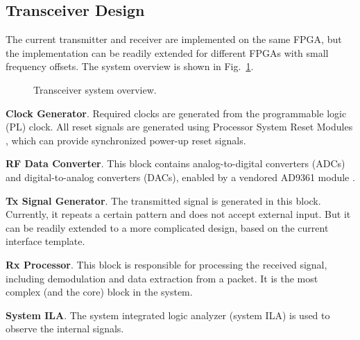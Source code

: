 \documentclass[journal,twoside]{IEEEtran}
\begin{document}
    \subsection{Transceiver Design}

      The current transmitter and receiver are implemented on the same FPGA,
      but the implementation can be readily extended for different FPGAs with small frequency offsets.
      The system overview is shown in Fig.~\ref{fig:system_overview}.
      \begin{figure}[htbp]
        \centering
        
        \caption{Transceiver system overview.}
        \label{fig:system_overview}
      \end{figure}

      \IEEEpubidadjcol
      \textbf{Clock Generator}.
      Required clocks are generated from the programmable logic (PL) clock.
      All reset signals are generated using Processor System Reset Modules \cite{xilinx:pg164},
      which can provide synchronized power-up reset signals.

      \textbf{RF Data Converter}.
      This block contains analog-to-digital converters (ADCs) and digital-to-analog converters (DACs),
      enabled by a vendored AD9361 module \cite{ad9361}.

      \textbf{Tx Signal Generator}.
      The transmitted signal is generated in this block.
      Currently, it repeats a certain pattern and does not accept external input.
      But it can be readily extended to a more complicated design, based on the current interface template.

      \textbf{Rx Processor}.
      This block is responsible for processing the received signal,
      including demodulation and data extraction from a packet.
      It is the most complex (and the core) block in the system.

      \textbf{System ILA}.
      The system integrated logic analyzer (system ILA) \cite{xilinx:pg261} is used to observe the internal signals.
\end{document}
